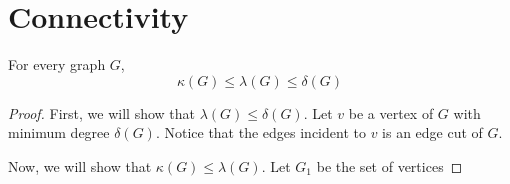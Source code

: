\chapter{Connectivity}

\begin{theorem}
  For every graph \(G\), 
  \begin{displaymath}
    \kappa(G) \leq \lambda(G) \leq \delta(G)
  \end{displaymath}
\end{theorem}

\begin{proof}
  First, we will show that \(\lambda(G) \leq \delta(G)\). Let
  \(v\) be a vertex of \(G\) with minimum degree \(\delta(G)\).
  Notice that the edges incident to \(v\) is an edge cut of
  \(G\).

  Now, we will show that \(\kappa(G) \leq \lambda(G)\). Let
  \(G_1\) be the set of vertices
\end{proof}


